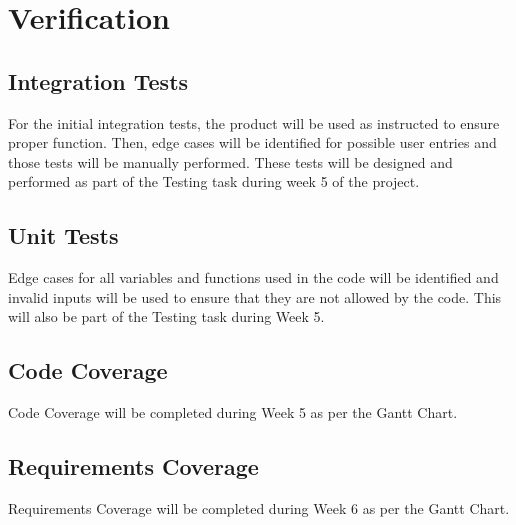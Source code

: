 \chapter{Verification}

\section{Integration Tests}
For the initial integration tests, the product will be used as instructed to ensure proper function. Then, edge cases will be identified for possible user entries and those tests will be manually performed. These tests will be designed and performed as part of the Testing task during week 5 of the project.

\section{Unit Tests}
Edge cases for all variables and functions used in the code will be identified and invalid inputs will be used to ensure that they are not allowed by the code. This will also be part of the Testing task during Week 5.

\section{Code Coverage}
Code Coverage will be completed during Week 5 as per the Gantt Chart.

\section{Requirements Coverage}
Requirements Coverage will be completed during Week 6 as per the Gantt Chart.